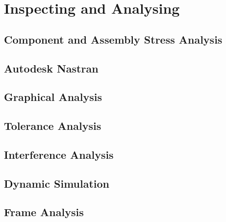 \chapter{Inspecting and Analysing}

\section{Component and Assembly Stress Analysis}

\section{Autodesk Nastran}

\section{Graphical Analysis}

\section{Tolerance Analysis}

\section{Interference Analysis}

\section{Dynamic Simulation}

\section{Frame Analysis}